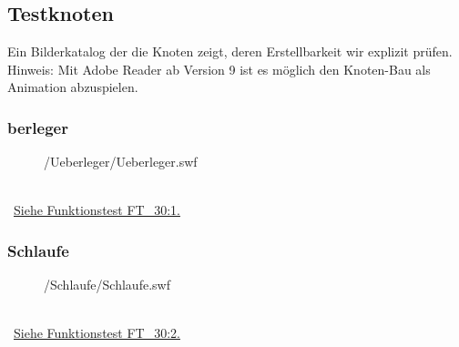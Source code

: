 %



\newpage





\subsection{Testknoten}

Ein Bilderkatalog der die Knoten zeigt, deren Erstellbarkeit wir explizit prüfen. Hinweis: Mit Adobe Reader ab Version 9 ist es möglich den Knoten-Bau als Animation abzuspielen.\\


	\subsubsection*{berleger\grqq}
	
		\begin{figure}[!h]
		
			\label{Abb:Test-Knoten:Ueberleger}
			\centering	
			
			{\KnotMedia/Ueberleger/Ueberleger.swf}
			
		\end{figure}
		
		~\\\mousecursor~\hyperref[FT:30:Ueberleger]{Siehe Funktionstest FT\_30:1.} 
	
	

\clearpage	



	\subsubsection*{\glqq Schlaufe\grqq}	
	
		\begin{figure}[!h]
		
			\label{Abb:Test-Knoten:Schlaufe}
			\centering	
			
			{\KnotMedia/Schlaufe/Schlaufe.swf}
			
		\end{figure}
		
		~\\\mousecursor~\hyperref[FT:30:Schlaufe]{Siehe Funktionstest FT\_30:2.} 
	
	

\clearpage	


